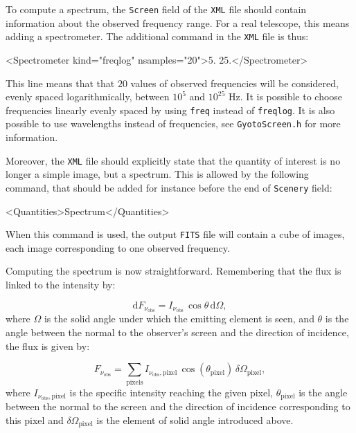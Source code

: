 \documentclass[a4paper,12pt]{article}
\newcommand{\D}{\mathrm{d}}
\begin{document}
To compute a spectrum, the \texttt{Screen} field of the \texttt{XML} file should contain information about the observed frequency range. For a real telescope, this means adding a spectrometer. The additional command in the \texttt{XML} file is thus:

\begin{code}
<Spectrometer kind="freqlog" nsamples="20">5. 25.</Spectrometer>
\end{code}

This line means that that $20$ values of observed frequencies will be considered, evenly spaced logarithmically, between $10^{5}$ and $10^{25}$ Hz. It is possible to choose frequencies linearly evenly spaced by using \texttt{freq} instead of \texttt{freqlog}. It is also possible to use wavelengths instead of frequencies, see \texttt{GyotoScreen.h} for more information.

Moreover, the \texttt{XML} file should explicitly state that the quantity of interest is no longer a simple image, but a spectrum. This is allowed by the following command, that should be added for instance before the end of \texttt{Scenery} field:

\begin{code}
<Quantities>Spectrum</Quantities>
\end{code}
When this command is used, the output \texttt{FITS} file will contain a cube of images, each image corresponding to one observed frequency.

Computing the spectrum is now straightforward. Remembering that the flux is linked to the intensity by:

\begin{equation}
\D F_{\nu_{\mathrm{obs}}} = I_{\nu_{\mathrm{obs}}}\,\cos\theta\,\D \Omega,
\end{equation}
where $\Omega$ is the solid angle under which the emitting element is seen, and $\theta$ is the angle between the normal to the observer's screen and the direction 
of incidence, the flux is given by:

\begin{equation}
\label{deffluxGyoto}
F_{\nu_{\mathrm{obs}}} = \sum_{\mathrm{pixels}} I_{\nu_{\mathrm{obs}},\mathrm{pixel}}\,\cos(\theta_{\mathrm{pixel}})\,\delta\Omega_{\mathrm{pixel}} ,
\end{equation}
where $I_{\nu_{\mathrm{obs}},\mathrm{pixel}}$ is the specific intensity reaching the given pixel, $\theta_{\mathrm{pixel}}$ is the angle between the normal to the screen and the direction of incidence corresponding to this pixel and $\delta\Omega_{\mathrm{pixel}}$ is the element of solid angle introduced above. 
\end{document}
